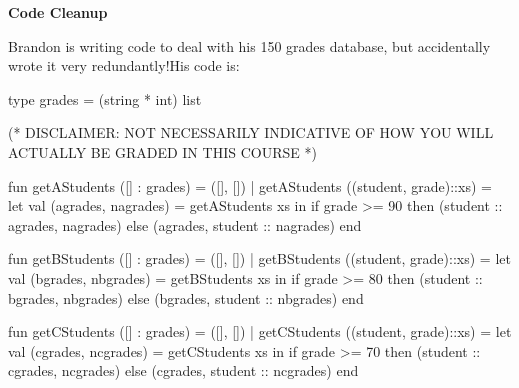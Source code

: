 \documentclass[addpoints,12pt]{exam}
\begin{document}
\begin{questions}
\newpage
{}

\textbf{Code Cleanup}

Brandon is writing code to deal with his 150 grades database, but
accidentally wrote it very redundantly!\footnotemark His code is:

\begin{codeblock}
  type grades = (string * int) list

  (* DISCLAIMER: NOT NECESSARILY INDICATIVE OF HOW YOU WILL
     ACTUALLY BE GRADED IN THIS COURSE
   *)

  fun getAStudents ([] : grades) = ([], [])
    | getAStudents ((student, grade)::xs) =
        let
          val (agrades, nagrades) = getAStudents xs
        in
          if grade >= 90 then
            (student :: agrades, nagrades)
          else
            (agrades, student :: nagrades)
        end

  fun getBStudents ([] : grades) = ([], [])
    | getBStudents ((student, grade)::xs) =
        let
          val (bgrades, nbgrades) = getBStudents xs
        in
          if grade >= 80 then
            (student :: bgrades, nbgrades)
          else
            (bgrades, student :: nbgrades)
        end

  fun getCStudents ([] : grades) = ([], [])
    | getCStudents ((student, grade)::xs) =
        let
          val (cgrades, ncgrades) = getCStudents xs
        in
          if grade >= 70 then
            (student :: cgrades, ncgrades)
          else
            (cgrades, student :: ncgrades)
        end
\end{codeblock}


\newpage

\end{questions}
\end{document}
